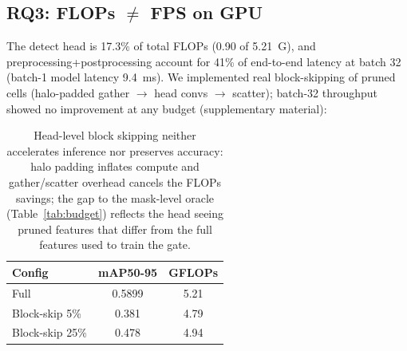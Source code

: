 \documentclass[a4paper,fleqn]{cas-dc}
\begin{document}
\subsection{RQ3: FLOPs $\neq$ FPS on GPU}
The detect head is 17.3\% of total FLOPs (0.90 of 5.21~G), and preprocessing+postprocessing account for 41\% of end-to-end latency at batch 32 (batch-1 model latency 9.4~ms). We implemented real block-skipping of pruned cells (halo-padded gather $\to$ head convs $\to$ scatter); batch-32 throughput showed no improvement at any budget (supplementary material):
\begin{table}[h]\centering\footnotesize
\caption{Head-level block skipping neither accelerates inference nor preserves accuracy: halo padding inflates compute and gather/scatter overhead cancels the FLOPs savings; the gap to the mask-level oracle (Table~\ref{tab:budget}) reflects the head seeing pruned features that differ from the full features used to train the gate.}
\label{tab:blockskip}
\begin{tabular}{lcc}
\toprule
Config & mAP50-95 & GFLOPs\\
\midrule
Full & 0.5899 & 5.21\\
Block-skip 5\% & 0.381 & 4.79\\
Block-skip 25\% & 0.478 & 4.94\\
\bottomrule
\end{tabular}
\end{table}
\end{document}
